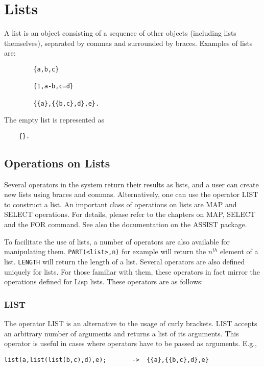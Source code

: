 \chapter{Lists}

A list is an object consisting of a sequence of other objects
(including lists themselves), separated by commas and surrounded by
braces.  Examples of lists are:
\begin{verbatim}
        {a,b,c}

        {1,a-b,c=d}

        {{a},{{b,c},d},e}.
\end{verbatim}
The empty list is represented as
\begin{verbatim}
	{}.
\end{verbatim}

\section{Operations on Lists}

Several operators in the system return their results as lists, and a user
can create new lists using braces and commas.  Alternatively, one can use
the operator LIST to construct a list.  An important class of operations
on lists are MAP and SELECT operations.  For details, please refer to the
chapters on MAP, SELECT and the FOR command.  See also the documentation
on the ASSIST package.

To facilitate the use of
lists, a number of operators are also available for manipulating
them. {\tt PART(<list>,n)} for example will return the
$n^{th}$ element of a list. {\tt LENGTH} will return the
length of a list.  Several operators are also defined uniquely for lists.
For those familiar with them, these operators in fact mirror the
operations defined for Lisp lists.  These operators are as follows:

\subsection{LIST}
\hypertarget{operator:LIST}{}

The operator LIST is an alternative to the usage of curly brackets. LIST
accepts an arbitrary number of arguments and returns a list
of its arguments. This operator is useful in cases where operators
have to be passed as arguments. E.g.,
\begin{verbatim}
list(a,list(list(b,c),d),e);       ->  {{a},{{b,c},d},e}
\end{verbatim}

